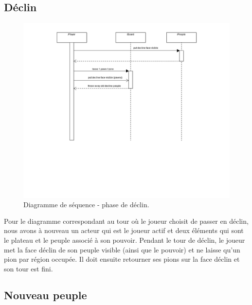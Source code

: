 \documentclass[11pt]{report}
\begin{document}
		\subsection{Déclin}
				\begin{figure}[!h]
\centering
\includegraphics[width=13cm]{Declinsequence.png}
\caption{Diagramme de séquence - phase de déclin.}
\end{figure}
		Pour le diagramme correspondant au tour où le joueur choisit de passer en déclin, nous avons à nouveau un acteur qui est le joueur actif et deux éléments qui sont le plateau et le peuple associé à son pouvoir. Pendant le tour de déclin, le joueur met la face déclin de son peuple visible (ainsi que le pouvoir) et ne laisse qu'un pion par région occupée. Il doit ensuite retourner ses pions sur la face déclin et son tour est fini.

		\subsection{Nouveau peuple}
		
\end{document}
